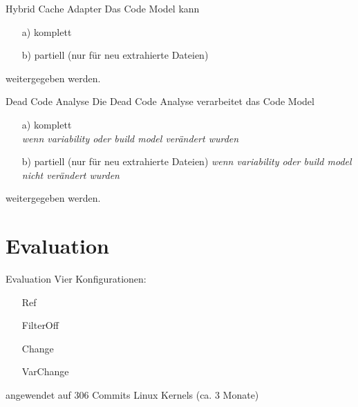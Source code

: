 \documentclass[aspectratio=43, noserifmath]{beamer}
\begin{document}
\begin{frame}{Hybrid Cache Adapter}
Das Code Model kann
\begin{itemize}
    \item[a)] komplett
    \item[b)] partiell (nur f\"ur neu extrahierte Dateien)
\end{itemize}
weitergegeben werden.
\end{frame}

\begin{frame}{Dead Code Analyse}
Die Dead Code Analyse verarbeitet das Code Model 
\begin{itemize}
    \item[a)] komplett \\
    \emph{wenn variability oder build model \alert{ver\"andert} wurden}
    \item[b)] partiell (nur f\"ur neu extrahierte Dateien)
    \emph{wenn variability oder build model \alert{nicht ver\"andert} wurden}
\end{itemize}
weitergegeben werden.
\end{frame}

\section{Evaluation}

\begin{frame}{Evaluation}
Vier Konfigurationen:
\begin{itemize}
    \item[\textbullet] Ref
    \item[\textbullet] FilterOff
    \item[\textbullet] Change
    \item[\textbullet] VarChange
\end{itemize}
angewendet auf 306 Commits Linux Kernels (ca. 3 Monate)
\end{frame}
\end{document}

